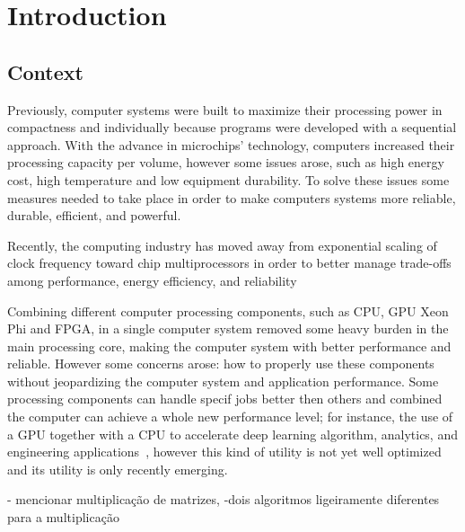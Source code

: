 \chapter{Introduction} \label{chap:intro}

\section*{}
\section{Context} \label{sec:context}

Previously, computer systems were built to maximize their processing power in compactness and individually because programs were developed with a sequential approach. With the advance in microchips' technology, computers increased their processing capacity per volume, however some issues arose, such as high energy cost, high temperature and low equipment durability. To solve these issues some measures needed to take place in order to make computers systems more reliable, durable, efficient, and powerful.

Recently, the computing industry has moved away from exponential scaling of clock frequency toward chip multiprocessors in order to better manage trade-offs among performance, energy efficiency, and reliability~\cite{Datta2008}

Combining different computer processing components, such as CPU, GPU Xeon Phi and FPGA, in a single computer system removed some heavy burden in the main processing core, making the computer system with better performance and reliable. However some concerns arose: how to properly use these components without jeopardizing the computer system and application performance. Some processing components can handle specif jobs better then others and combined the computer can achieve a whole new performance level; for instance, the use of a GPU together with a CPU to accelerate deep learning algorithm, analytics, and engineering applications~\cite{NvidiaGPU}, however this kind of utility is not yet well optimized and its utility is only recently emerging.


- mencionar multiplicação de matrizes,
-dois algoritmos ligeiramente diferentes para a multiplicação






